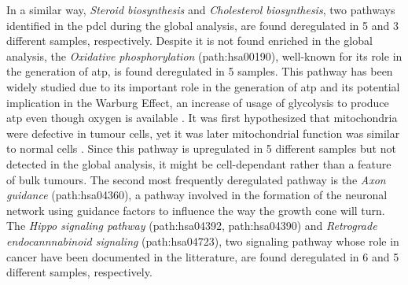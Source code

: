 In a similar way, \textit{Steroid biosynthesis} and \textit{Cholesterol biosynthesis}, two pathways identified in the \acrshort{pdcl} during the global analysis, are found deregulated in 5 and 3 different samples, respectively.
Despite it is not found enriched in the global analysis, the \textit{Oxidative phosphorylation} (path:hsa00190), well-known for its role in the generation of \acrshort{atp}, is found deregulated in 5 samples.
This pathway has been widely studied due to its important role in the generation of \acrshort{atp} and its potential implication in the Warburg Effect, an increase of usage of glycolysis to produce \acrshort{atp} even though oxygen is available \cite*{Spinicci2022}.
It was first hypothesized that mitochondria were defective in tumour cells, yet it was later mitochondrial function was similar to normal cells \cite*{Cairns2011}.
Since this pathway is upregulated in 5 different samples but not detected in the global analysis, it might be cell-dependant rather than a feature of bulk tumours.
The second most frequently deregulated pathway is the \textit{Axon guidance} (path:hsa04360), a pathway involved in the formation of the neuronal network using guidance factors to influence the way the growth cone will turn.
The \textit{Hippo signaling pathway} (path:hsa04392, path:hsa04390) and \textit{Retrograde endocannnabinoid signaling} (path:hsa04723), two signaling pathway whose role in cancer have been documented in the litterature, are found deregulated in 6 and 5 different samples, respectively.

